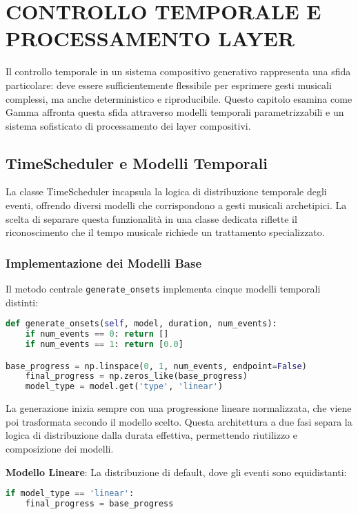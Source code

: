 
\section{CONTROLLO TEMPORALE E PROCESSAMENTO LAYER}
Il controllo temporale in un sistema compositivo generativo rappresenta una sfida particolare: deve essere sufficientemente flessibile per esprimere gesti musicali complessi, ma anche deterministico e riproducibile. Questo capitolo esamina come Gamma affronta questa sfida attraverso modelli temporali parametrizzabili e un sistema sofisticato di processamento dei layer compositivi.
\subsection{TimeScheduler e Modelli Temporali}
La classe TimeScheduler incapsula la logica di distribuzione temporale degli eventi, offrendo diversi modelli che corrispondono a gesti musicali archetipici. La scelta di separare questa funzionalità in una classe dedicata riflette il riconoscimento che il tempo musicale richiede un trattamento specializzato.
\subsubsection{Implementazione dei Modelli Base}
Il metodo centrale \texttt{generate\_onsets} implementa cinque modelli temporali distinti:

\begin{lstlisting}[language=Python]
def generate_onsets(self, model, duration, num_events):
    if num_events == 0: return []
    if num_events == 1: return [0.0]

base_progress = np.linspace(0, 1, num_events, endpoint=False)
    final_progress = np.zeros_like(base_progress)
    model_type = model.get('type', 'linear')
\end{lstlisting}

La generazione inizia sempre con una progressione lineare normalizzata, che viene poi trasformata secondo il modello scelto. Questa architettura a due fasi separa la logica di distribuzione dalla durata effettiva, permettendo riutilizzo e composizione dei modelli.

\textbf{Modello Lineare}: La distribuzione di default, dove gli eventi sono equidistanti:
\begin{lstlisting}[language=Python]
if model_type == 'linear':
    final_progress = base_progress
\end{lstlisting}


